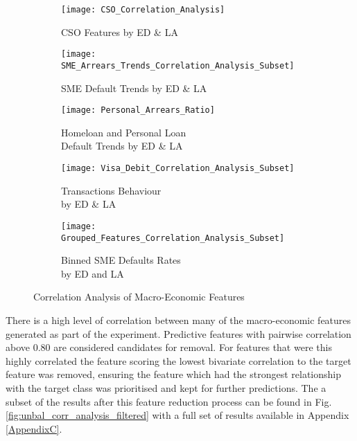 \begin{figure}[H]
	\begin{adjustwidth}{-2cm}{-2cm}
	\centering
 	\begin{subfigure}[b]{0.6\textwidth}
 		\captionsetup{font=scriptsize}
 		\texttt{[image: CSO\_Correlation\_Analysis]}
 		\caption{CSO Features by ED \& LA\\}
 		\label{fig:CSOCorrelation}
 	\end{subfigure}
	\begin{subfigure}[b]{0.6\textwidth}
		\captionsetup{font=scriptsize}
		\texttt{[image: SME\_Arrears\_Trends\_Correlation\_Analysis\_Subset]}
		\caption{SME Default Trends by ED \& LA}\label{fig:smeArrearsCorrelation}
	\end{subfigure} 
		\medskip
	\begin{subfigure}[b]{0.6\textwidth}
		\captionsetup{font=scriptsize}
		\texttt{[image: Personal\_Arrears\_Ratio]}
		\caption{Homeloan and Personal Loan \\Default Trends by ED \& LA}
		\label{fig:personalArrearsCorrelation}
	\end{subfigure} 
	\begin{subfigure}[b]{0.6\textwidth}
		\captionsetup{font=scriptsize}
		\texttt{[image: Visa\_Debit\_Correlation\_Analysis\_Subset]}
		\caption{Transactions Behaviour \\by ED \& LA }\label{fig:transVisaCorrelation}
	\end{subfigure}
		\medskip	
	\begin{subfigure}[b]{0.6\textwidth}
		\captionsetup{font=scriptsize}
		\texttt{[image: Grouped\_Features\_Correlation\_Analysis\_Subset]}
		\caption{Binned SME Defaults Rates \\by ED and LA\\}
		\label{fig:groupedFeaturesCorrelation}
	\end{subfigure}
	\caption{Correlation Analysis of Macro-Economic Features}
	\label{fig:unbal_corr_analysis}
	\end{adjustwidth}
\end{figure}

There is a high level of correlation between many of the macro-economic features generated as part of the experiment. Predictive features with pairwise correlation above 0.80 are considered candidates for removal. For features that were this highly correlated the feature scoring the lowest bivariate correlation to the target feature was removed, ensuring the feature which had the strongest relationship with the target class was prioritised and kept for further predictions. The a subset of the results after this feature reduction process can be found in Fig. \ref{fig:unbal_corr_analysis_filtered} with a full set of results available in Appendix \ref{AppendixC}. 

